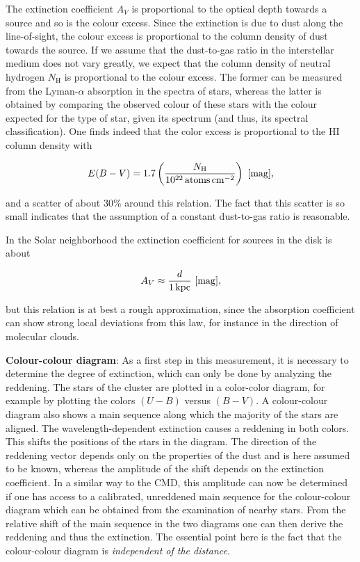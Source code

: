 \documentclass[a4paper,11pt]{article}
\begin{document}
{\noindent}The extinction coefficient $A_V$ is proportional to the optical depth towards a source and so is the colour excess. Since the extinction is due to dust along the line-of-sight, the colour excess is proportional to the column density of dust towards the source. If we assume that the dust-to-gas ratio in the interstellar medium does not vary greatly, we expect that the column density of neutral hydrogen $N_\mathrm{H}$ is proportional to the colour excess. The former can be measured from the Lyman-$\alpha$ absorption in the spectra of stars, whereas the latter is obtained by comparing the observed colour of these stars with the colour expected for the type of star, given its spectrum (and thus, its spectral classification). One finds indeed that the color excess is proportional to the HI column density with

\begin{align*}
    E(B-V) = 1.7 \left(\frac{N_\mathrm{H}}{10^{22}\,{\rm atoms\,cm^{-2}}}\right) ~ [{\rm mag}],
\end{align*}

{\noindent}and a scatter of about 30\% around this relation. The fact that this scatter is so small indicates that the assumption of a constant dust-to-gas ratio is reasonable.

{\noindent}In the Solar neighborhood the extinction coefficient for sources in the disk is about

\begin{align*}
    A_V \approx \frac{d}{1\,{\rm kpc}} ~ [{\rm mag}],
\end{align*}

{\noindent}but this relation is at best a rough approximation, since the absorption coefficient can show strong local deviations from this law, for instance in the direction of molecular clouds.

{\noindent}\textbf{Colour-colour diagram}: As a first step in this measurement, it is necessary to determine the degree of extinction, which can only be done by analyzing the reddening. The stars of the cluster are plotted in a color-color diagram, for example by plotting the colors $(U-B)$ versus $(B-V)$. A colour-colour diagram also shows a main sequence along which the majority of the stars are aligned. The wavelength-dependent extinction causes a reddening in both colors. This shifts the positions of the stars in the diagram. The direction of the reddening vector depends only on the properties of the dust and is here assumed to be known, whereas the amplitude of the shift depends on the extinction coefficient. In a similar way to the CMD, this amplitude can now be determined if one has access to a calibrated, unreddened main sequence for the colour-colour diagram which can be obtained from the examination of nearby stars. From the relative shift of the main sequence in the two diagrams one can then derive the reddening and thus the extinction. The essential point here is the fact that the colour-colour diagram is \textit{independent of the distance}.
\end{document}
